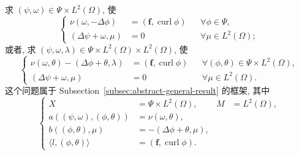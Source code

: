 求 $(\psi,\omega)\in\Psi\times L^2(\Omega)$, 使
\begin{equation}\label{eq:incompressible-stream-vorticity-pair}
\left\{
\begin{aligned}
\nu(\omega,-\Delta\phi)
&=(\mathbf f,\operatorname{curl}\phi)
&&\forall\phi\in\Psi,\\
(\Delta\psi+\omega,\mu)&=0
&&\forall\mu\in L^2(\Omega);
\end{aligned}
\right.
\end{equation}
或者, 求
$(\psi,\omega,\lambda)\in
\Psi\times L^2(\Omega)\times L^2(\Omega)$, 使
\begin{equation}\label{eq:incompressible-stream-vorticity-multiplier}
\left\{
\begin{aligned}
\nu(\omega,\theta)-(\Delta\phi+\theta,\lambda)
&=(\mathbf f,\operatorname{curl}\phi)
&&\forall(\phi,\theta)\in\Psi\times L^2(\Omega),\\
(\Delta\psi+\omega,\mu)&=0
&&\forall\mu\in L^2(\Omega).
\end{aligned}
\right.
\end{equation}
这个问题属于 Subsection~\ref{subsec:abstract-general-result} 的框架,
其中
\begin{equation}\label{eq:incompressible-stream-abstract-interpretation}
\left\{
\begin{aligned}
X&=\Psi\times L^2(\Omega),
&M&=L^2(\Omega),\\
a((\psi,\omega),(\phi,\theta))
&=\nu(\omega,\theta),\\
b((\phi,\theta),\mu)
&=-(\Delta\phi+\theta,\mu),\\
\langle l,(\phi,\theta)\rangle
&=(\mathbf f,\operatorname{curl}\phi).
\end{aligned}
\right.
\end{equation}
\ChapterThreeSectionTwoDeferredContinuation
